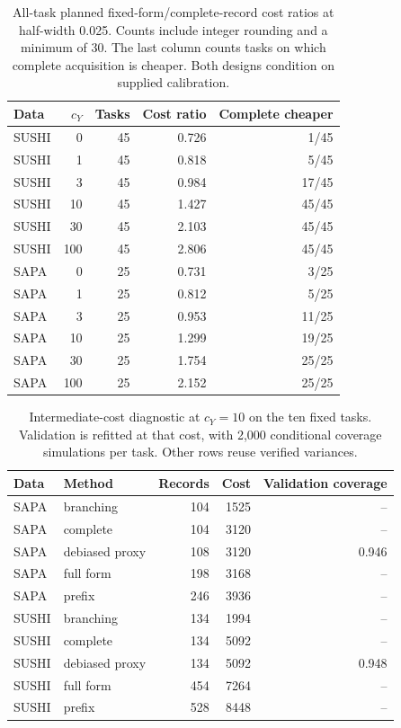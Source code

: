 \begin{table}[t]
\centering
\caption{All-task planned fixed-form/complete-record cost ratios at half-width 0.025. Counts include integer rounding and a minimum of 30. The last column counts tasks on which complete acquisition is cheaper. Both designs condition on supplied calibration.}
\label{tab:costdetail}
\small
\setlength{\tabcolsep}{4pt}
\begin{tabular}{lrrrr}
\toprule
Data & $c_Y$ & Tasks & Cost ratio & Complete cheaper \\
\midrule
SUSHI & 0 & 45 & 0.726 & 1/45 \\
SUSHI & 1 & 45 & 0.818 & 5/45 \\
SUSHI & 3 & 45 & 0.984 & 17/45 \\
SUSHI & 10 & 45 & 1.427 & 45/45 \\
SUSHI & 30 & 45 & 2.103 & 45/45 \\
SUSHI & 100 & 45 & 2.806 & 45/45 \\
SAPA & 0 & 25 & 0.731 & 3/25 \\
SAPA & 1 & 25 & 0.812 & 5/25 \\
SAPA & 3 & 25 & 0.953 & 11/25 \\
SAPA & 10 & 25 & 1.299 & 19/25 \\
SAPA & 30 & 25 & 1.754 & 25/25 \\
SAPA & 100 & 25 & 2.152 & 25/25 \\
\bottomrule
\end{tabular}
\end{table}
\begin{table}[t]
\centering
\caption{Intermediate-cost diagnostic at $c_Y=10$ on the ten fixed tasks. Validation is refitted at that cost, with 2,000 conditional coverage simulations per task. Other rows reuse verified variances.}
\label{tab:cost10detail}
\small
\setlength{\tabcolsep}{4pt}
\begin{tabular}{llrrr}
\toprule
Data & Method & Records & Cost & Validation coverage \\
\midrule
SAPA & branching & 104 & 1525 & -- \\
SAPA & complete & 104 & 3120 & -- \\
SAPA & debiased proxy & 108 & 3120 & 0.946 \\
SAPA & full form & 198 & 3168 & -- \\
SAPA & prefix & 246 & 3936 & -- \\
SUSHI & branching & 134 & 1994 & -- \\
SUSHI & complete & 134 & 5092 & -- \\
SUSHI & debiased proxy & 134 & 5092 & 0.948 \\
SUSHI & full form & 454 & 7264 & -- \\
SUSHI & prefix & 528 & 8448 & -- \\
\bottomrule
\end{tabular}
\end{table}
